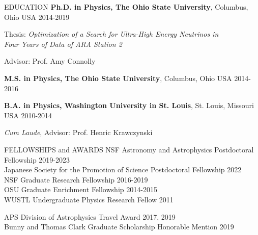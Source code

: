 \documentclass{resume} %
\newenvironment{list1}{
  \begin{list}{\ding{113}}{%
      \setlength{\itemsep}{0in}
      \setlength{\parsep}{0in} \setlength{\parskip}{0in}
      \setlength{\topsep}{0in} \setlength{\partopsep}{0in} 
      \setlength{\leftmargin}{0.17in}}}{\end{list}}
\begin{document}


\begin{rSection}{EDUCATION}
\textbf{Ph.D. in Physics, The Ohio State University}, Columbus, Ohio USA \hfill 2014-2019\\
\vspace*{-.15in}
\begin{list1}
\item[]Thesis: \textit{Optimization of a Search for Ultra-High Energy Neutrinos in \\ Four Years of Data of ARA Station 2} 
\item[]Advisor: Prof. Amy Connolly
\end{list1}

\textbf{M.S. in Physics, The Ohio State University}, Columbus, Ohio USA \hfill 2014-2016

\textbf{B.A. in Physics, Washington University in St. Louis}, St. Louis, Missouri USA \hfill 2010-2014\\
\vspace*{-.15in}
\begin{list1}
\item[] \textit{Cum Laude}, Advisor: Prof. Henric Krawczynski
\end{list1}
\end{rSection}



\begin{rSection}{FELLOWSHIPS and AWARDS}
NSF Astronomy and Astrophysics Postdoctoral Fellowship \hfill 2019-2023 \\
Japanese Society for the Promotion of Science Postdoctoral Fellowship \hfill 2022 \\
NSF Graduate Research Fellowship \hfill 2016-2019 \\
OSU Graduate Enrichment Fellowship \hfill 2014-2015 \\
WUSTL Undergraduate Physics Research Fellow \hfill 2011 \\
\vspace{-0.3cm}

APS Division of Astrophysics Travel Award \hfill 2017, 2019 \\
Bunny and Thomas Clark Graduate Scholarship Honorable Mention \hfill 2019


\end{rSection}
\end{document}
